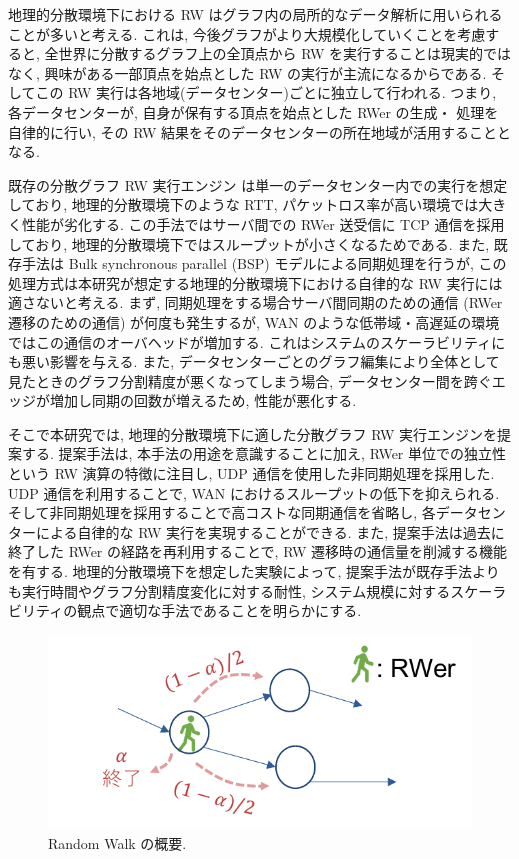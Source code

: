 地理的分散環境下における RW はグラフ内の局所的なデータ解析に用いられることが多いと考える. これは, 今後グラフがより大規模化していくことを考慮すると, 全世界に分散するグラフ上の全頂点から RW を実行することは現実的ではなく, 興味がある一部頂点を始点とした RW の実行が主流になるからである. そしてこの RW 実行は各地域(データセンター)ごとに独立して行われる. つまり, 各データセンターが, 自身が保有する頂点を始点とした RWer の生成・ 処理を自律的に行い, その RW 結果をそのデータセンターの所在地域が活用することとなる. 

既存の分散グラフ RW 実行エンジン \cite{10.1145/3341301.3359634} は単一のデータセンター内での実行を想定しており, 地理的分散環境下のような RTT, パケットロス率が高い環境では大きく性能が劣化する. この手法ではサーバ間での RWer 送受信に TCP 通信を採用しており, 地理的分散環境下ではスループットが小さくなるためである. また, 既存手法は Bulk synchronous parallel (BSP) モデルによる同期処理を行うが, この処理方式は本研究が想定する地理的分散環境下における自律的な RW 実行には適さないと考える. まず, 同期処理をする場合サーバ間同期のための通信 (RWer 遷移のための通信) が何度も発生するが, WAN のような低帯域・高遅延の環境ではこの通信のオーバヘッドが増加する. これはシステムのスケーラビリティにも悪い影響を与える. また, データセンターごとのグラフ編集により全体として見たときのグラフ分割精度が悪くなってしまう場合, データセンター間を跨ぐエッジが増加し同期の回数が増えるため, 性能が悪化する. 

そこで本研究では, 地理的分散環境下に適した分散グラフ RW 実行エンジンを提案する. 提案手法は, 本手法の用途を意識することに加え, RWer 単位での独立性という RW 演算の特徴に注目し, UDP 通信を使用した非同期処理を採用した. UDP 通信を利用することで, WAN におけるスループットの低下を抑えられる. そして非同期処理を採用することで高コストな同期通信を省略し, 各データセンターによる自律的な RW 実行を実現することができる. また, 提案手法は過去に終了した RWer の経路を再利用することで, RW 遷移時の通信量を削減する機能を有する. 地理的分散環境下を想定した実験によって, 提案手法が既存手法よりも実行時間やグラフ分割精度変化に対する耐性, システム規模に対するスケーラビリティの観点で適切な手法であることを明らかにする. 

\begin{figure}[t]
    \centering
    \includegraphics[scale=1.0]{figure/RandomWalk.pdf}
    \caption{Random Walk の概要.}
    \label{Random Walk の概要}
\end{figure}

